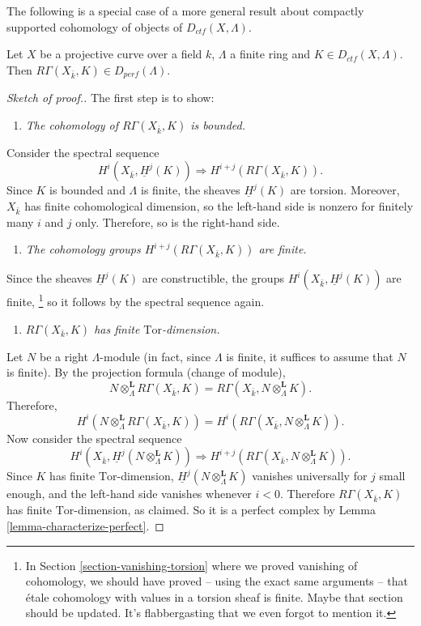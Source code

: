 \noindent
The following is a special case of a more general result about
compactly supported cohomology of objects of $D_{ctf}(X, \Lambda)$.

\begin{proposition}
\label{proposition-projective-curve-constructible-cohomology}
Let $X$ be a projective curve over a field $k$, $\Lambda$ a finite ring and
$K\in D_{ctf}(X, \Lambda)$. Then $R\Gamma(X_{\bar k}, K)\in
D_{perf}(\Lambda)$.
\end{proposition}

\begin{proof}[Sketch of proof.]
The first step is to show:
\begin{enumerate}
\item[(1)]
{\it The cohomology of $R\Gamma(X_{\bar k}, K)$ is bounded.}
\end{enumerate}
Consider the spectral sequence
$$
H^i(X_{\bar k}, \underline H^j(K))
\Rightarrow
H^{i+j} (R\Gamma(X_{\bar k}, K)).
$$
Since $K$ is bounded and $\Lambda$ is finite, the sheaves $\underline H^j(K)$
are torsion. Moreover, $X_{\bar k}$ has finite cohomological dimension, so the
left-hand side is nonzero for finitely many $i$ and $j$ only. Therefore, so is
the right-hand side.
\begin{enumerate}
\item[(2)]
{\it The cohomology groups $H^{i+j} (R\Gamma(X_{\bar k}, K))$ are finite.}
\end{enumerate}
Since the sheaves $\underline H^j(K)$ are constructible, the groups
$H^i(X_{\bar k}, \underline H^j(K))$ are finite, \footnote{In
Section \ref{section-vanishing-torsion}
where we proved vanishing of
cohomology, we should have proved -- using the exact same arguments -- that
\'etale cohomology with values in a torsion sheaf is finite. Maybe that section
should be updated. It's flabbergasting that we even forgot to mention it.} so
it follows by the spectral sequence again.
\begin{enumerate}
\item[(3)]
{\it $R\Gamma(X_{\bar k}, K)$ has finite $\text{Tor}$-dimension.}
\end{enumerate}
Let $N$ be a right $\Lambda$-module (in fact, since $\Lambda$ is finite, it
suffices to assume that $N$ is finite). By the projection formula (change of
module),
$$
N \otimes^\mathbf{L}_\Lambda R \Gamma(X_{\bar k}, K) = R\Gamma(X_{\bar k},
N \otimes^\mathbf{L}_\Lambda K).
$$
Therefore,
$$
H^i (N \otimes^\mathbf{L}_\Lambda R\Gamma(X_{\bar k}, K)) = H^i(R\Gamma(X_{\bar
k}, N \otimes_{\Lambda}^\mathbf{L} K)).
$$
Now consider the spectral sequence
$$
H^i (X_{\bar k}, \underline H^j (N \otimes_{\Lambda}^\mathbf{L} K))
\Rightarrow
H^{i+j}(R\Gamma(X_{\bar k}, N \otimes_{\Lambda}^\mathbf{L} K)).
$$
Since $K$ has finite $\text{Tor}$-dimension, $\underline H^j
(N \otimes_{\Lambda}^\mathbf{L} K)$ vanishes universally for $j$ small enough,
and the left-hand side vanishes whenever $i < 0$. Therefore $R\Gamma(X_{\bar
k}, K)$ has finite $\text{Tor}$-dimension, as claimed. So it is a perfect
complex by Lemma \ref{lemma-characterize-perfect}.
\end{proof}





